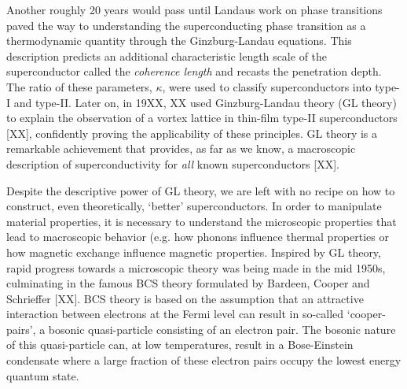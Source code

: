 Another roughly 20 years would pass until Landaus work on phase transitions paved the way to understanding the superconducting phase transition as a thermodynamic quantity through the Ginzburg-Landau equations. This description predicts an additional characteristic length scale of the superconductor called the \emph{coherence length} and recasts the penetration depth. The ratio of these parameters, $\kappa$, were used to classify superconductors into type-I and type-II. Later on, in 19XX, XX used Ginzburg-Landau theory (GL theory) to explain the observation of a vortex lattice in thin-film type-II superconductors [XX], confidently proving the applicability of these principles. GL theory is a remarkable achievement that provides, as far as we know, a macroscopic description of superconductivity for \emph{all} known superconductors [XX].

Despite the descriptive power of GL theory, we are left with no recipe on how to construct, even theoretically, `better' superconductors. In order to manipulate material properties, it is necessary to understand the microscopic properties that lead to macroscopic behavior (e.g. how phonons influence thermal properties or how magnetic exchange influence magnetic properties. Inspired by GL theory, rapid progress towards a microscopic theory was being made in the mid 1950s, culminating in the famous BCS theory formulated by Bardeen, Cooper and Schrieffer [XX]. BCS theory is based on the assumption that an attractive interaction between electrons at the Fermi level can result in so-called `cooper-pairs', a bosonic quasi-particle consisting of an electron pair. The bosonic nature of this quasi-particle can, at low temperatures, result in a Bose-Einstein condensate where a large fraction of these electron pairs occupy the lowest energy quantum state.

